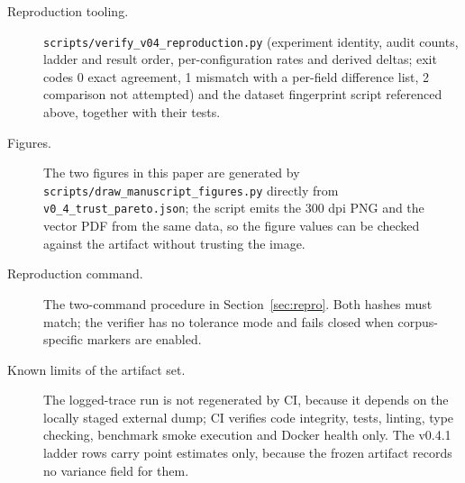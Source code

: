 \documentclass[letterpaper,twocolumn,10pt]{article}
\begin{document}
\begin{description}
\item[Reproduction tooling.] \texttt{scripts/verify\_v04\_reproduction.py}
(experiment identity, audit counts, ladder and result order, per-configuration
rates and derived deltas; exit codes 0 exact agreement, 1 mismatch with a
per-field difference list, 2 comparison not attempted) and the dataset
fingerprint script referenced above, together with their tests.

\item[Figures.] The two figures in this paper are generated by
\texttt{scripts/draw\_manuscript\_figures.py} directly from
\texttt{v0\_4\_trust\_pareto.json}; the script emits the 300 dpi PNG and the
vector PDF from the same data, so the figure values can be checked against the
artifact without trusting the image.

\item[Reproduction command.] The two-command procedure in
Section~\ref{sec:repro}. Both hashes must match; the verifier has no tolerance
mode and fails closed when corpus-specific markers are enabled.

\item[Known limits of the artifact set.] The logged-trace run is not
regenerated by CI, because it depends on the locally staged external dump; CI
verifies code integrity, tests, linting, type checking, benchmark smoke
execution and Docker health only. The v0.4.1 ladder rows carry point estimates
only, because the frozen artifact records no variance field for them.

\end{description}

\cleardoublepage




\end{document}
